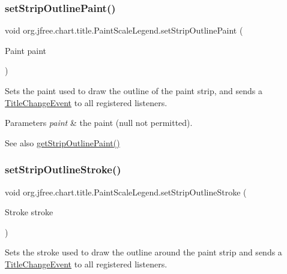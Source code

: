 \subsubsection{\texorpdfstring{set\+Strip\+Outline\+Paint()}{setStripOutlinePaint()}}
{\footnotesize\ttfamily void org.\+jfree.\+chart.\+title.\+Paint\+Scale\+Legend.\+set\+Strip\+Outline\+Paint (\begin{DoxyParamCaption}\item[{Paint}]{paint }\end{DoxyParamCaption})}

Sets the paint used to draw the outline of the paint strip, and sends a \mbox{\hyperlink{}{Title\+Change\+Event}} to all registered listeners.


\begin{DoxyParams}{Parameters}
{\em paint} & the paint ({\ttfamily null} not permitted).\\
\hline
\end{DoxyParams}
\begin{DoxySeeAlso}{See also}
\mbox{\hyperlink{classorg_1_1jfree_1_1chart_1_1title_1_1_paint_scale_legend_a36458115671fefe01a989b77fad034d8}{get\+Strip\+Outline\+Paint()}} 
\end{DoxySeeAlso}
\mbox{\label{classorg_1_1jfree_1_1chart_1_1title_1_1_paint_scale_legend_aa72881dc0321ee1d773943e170b60d62}} 
\subsubsection{\texorpdfstring{set\+Strip\+Outline\+Stroke()}{setStripOutlineStroke()}}
{\footnotesize\ttfamily void org.\+jfree.\+chart.\+title.\+Paint\+Scale\+Legend.\+set\+Strip\+Outline\+Stroke (\begin{DoxyParamCaption}\item[{Stroke}]{stroke }\end{DoxyParamCaption})}

Sets the stroke used to draw the outline around the paint strip and sends a \mbox{\hyperlink{}{Title\+Change\+Event}} to all registered listeners.


